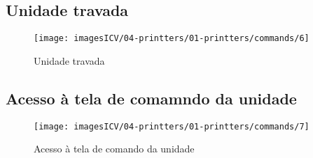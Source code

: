 \subsection{Unidade travada}
\begin{figure}
    \centering
    \texttt{[image: imagesICV/04-printters/01-printters/commands/6]}
    \caption{Unidade travada}
\end{figure}
\newpage
\thispagestyle{fancy}
\vspace{\fill}

\subsection{Acesso à tela de comamndo da unidade}
\begin{figure}
    \centering
    \texttt{[image: imagesICV/04-printters/01-printters/commands/7]}
    \caption{Acesso à tela de comando da unidade}
\end{figure}


